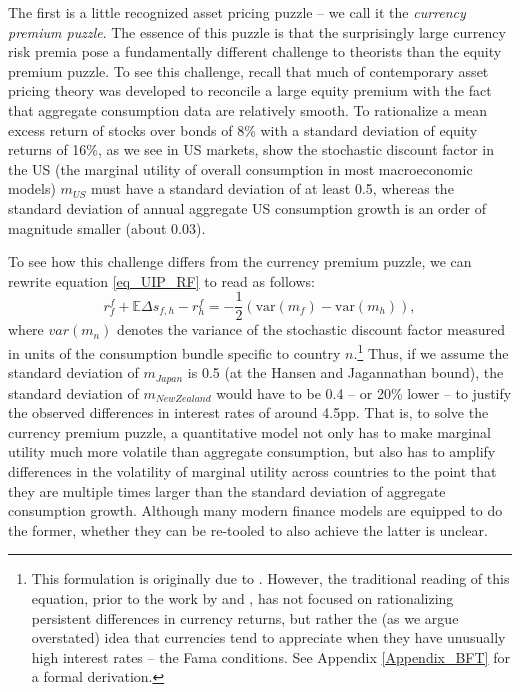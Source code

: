 \documentclass[11pt]{article}
\begin{document}
The first is a little recognized asset pricing puzzle -- we call it the \textit{currency premium puzzle}. The essence of this puzzle is that the surprisingly large currency risk premia pose a fundamentally different challenge to theorists than the equity premium puzzle. To see this challenge, recall that much of contemporary asset pricing theory was developed to reconcile a large equity premium with the fact that aggregate consumption data are relatively smooth. To rationalize a mean excess return of stocks over bonds of 8\% with a standard deviation of equity returns of 16\%, as we see in US markets, \citet{HansenJagannathan1991} show the stochastic discount factor in the US (the marginal utility of overall consumption in most macroeconomic models) $m_{US}$ must have a standard deviation of at least 0.5, whereas the standard deviation of annual aggregate US consumption growth is an order of magnitude smaller (about 0.03).  

To see how this challenge differs from the currency premium puzzle, we can rewrite equation \ref{eq_UIP_RF} to read as follows: 
\begin{equation}\label{eq_BFT}
  r^f_f + \mathbb{E} \Delta s_{f,h} - r^f_h 
  =-\frac{1}{2}\left(\text{var}(m_f)- \text{var}(m_h)\right),
\end{equation} 
where $var(m_n)$ denotes the variance of the stochastic discount factor measured in units of the consumption bundle specific to country $n$.\footnote{This formulation is originally due to \cite{Backusetal2001}. However, the traditional reading of this equation, prior to the work by \cite{LustigRoussanovVerdelhan2011} and \cite{HassanMano2019}, has not focused on rationalizing persistent differences in currency returns, but rather the (as we argue overstated) idea that currencies tend to appreciate when they have unusually high interest rates -- the Fama conditions. See Appendix \ref{Appendix_BFT} for a formal derivation.} Thus, if we assume the standard deviation of $m_{Japan}$ is 0.5 (at the Hansen and Jagannathan bound), the standard deviation of $m_{New Zealand}$ would have to be 0.4 -- or 20\% lower -- to justify the observed differences in interest rates of around 4.5pp. That is, to solve the currency premium puzzle, a quantitative model not only has to make marginal utility much more volatile than aggregate consumption, but also has to amplify differences in the volatility of marginal utility across countries to the point that they are multiple times larger than the standard deviation of aggregate consumption growth. Although many modern finance models are equipped to do the former, whether they can be re-tooled to also achieve the latter is unclear. 
\end{document}
